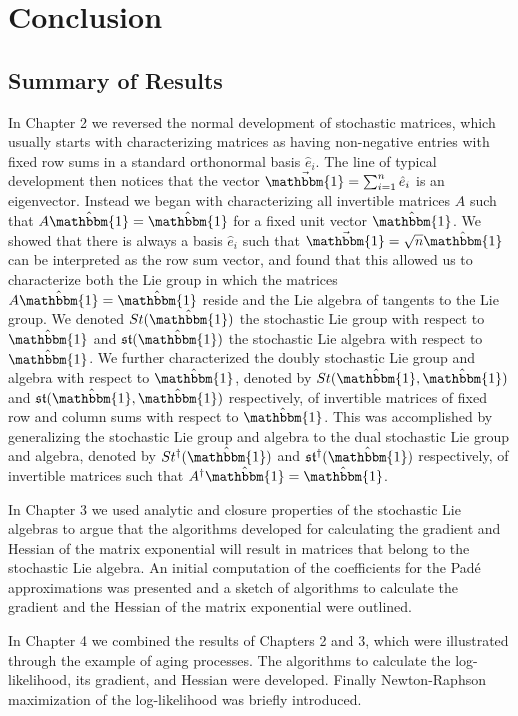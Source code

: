 \chapter{Conclusion}
\section{Summary of Results}
In Chapter 2 we reversed the normal development of stochastic matrices, which usually starts 
with characterizing matrices as having non-negative entries with fixed row sums in a
standard orthonormal basis $\hat{e}_i$. The line of typical development then notices that
the vector $\vec{\mathbbm{1}} = \sum_{i=1}^n \hat{e}_i$ is an eigenvector. Instead we began
with characterizing all invertible matrices $A$ such that $A \hat{\mathbbm{1}} = \hat{\mathbbm{1}}$
for a fixed unit vector $\hat{\mathbbm{1}}$. We showed that there is always a basis $\hat{e}_i$ 
such that $\vec{\mathbbm{1}} = \sqrt{n} \hat{\mathbbm{1}}$ can be interpreted as the row sum
vector, and found that this allowed us to characterize both the Lie group in which the 
matrices $A \hat{\mathbbm{1}} = \hat{\mathbbm{1}}$ reside and the Lie algebra of tangents to
the Lie group. We denoted $St(\hat{\mathbbm{1}})$ the stochastic Lie group with respect to $\hat{\mathbbm{1}}$ 
and $\mathfrak{st}(\hat{\mathbbm{1}})$ the stochastic Lie algebra with respect to $\hat{\mathbbm{1}}$. 
We further characterized the doubly stochastic Lie group and algebra with respect to $\hat{\mathbbm{1}}$, 
denoted by $St(\hat{\mathbbm{1}}, \hat{\mathbbm{1}})$ and $\mathfrak{st}(\hat{\mathbbm{1}}, \hat{\mathbbm{1}})$ 
respectively, of invertible matrices of fixed row and column sums with respect to $\hat{\mathbbm{1}}$. 
This was accomplished by generalizing the stochastic Lie group and algebra to the dual 
stochastic Lie group and algebra, denoted by $St^\dagger(\hat{\mathbbm{1}})$ and $\mathfrak{st}^\dagger(\hat{\mathbbm{1}})$ 
respectively, of invertible matrices such that $A^\dagger \hat{\mathbbm{1}} = \hat{\mathbbm{1}}$.

In Chapter 3 we used analytic and closure properties of the stochastic Lie algebras to argue 
that the algorithms developed for calculating the gradient and Hessian of the matrix
exponential will result in matrices that belong to the stochastic Lie algebra. An initial
computation of the coefficients for the Pad\'{e} approximations was presented and a sketch
of algorithms to calculate the gradient and the Hessian of the matrix exponential were 
outlined.

In Chapter 4 we combined the results of Chapters 2 and 3, which were illustrated through the 
example of aging processes. The algorithms to calculate the log-likelihood, its gradient, 
and Hessian were developed. Finally Newton-Raphson maximization of the log-likelihood was 
briefly introduced.
